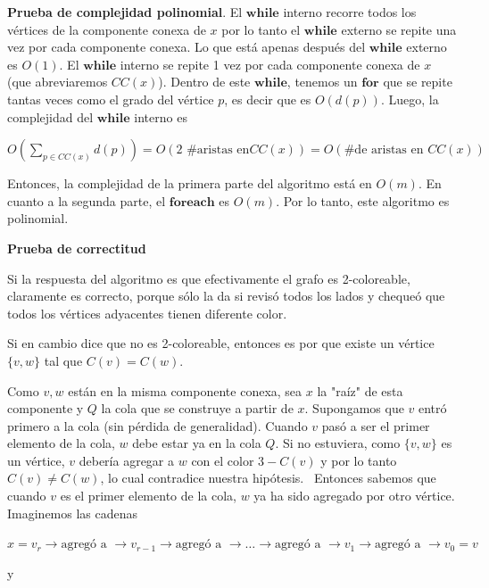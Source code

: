 \documentclass[10pt,a4paper]{article}
\begin{document}
\textbf{Prueba de complejidad polinomial}. El $\textbf{while}$ interno recorre todos los vértices de la componente conexa de $x$ por lo tanto el $\textbf{while}$ externo se repite una vez por cada componente conexa. Lo que está apenas después del $\textbf{while}$ externo es $O(1)$. El $\textbf{while}$ interno se repite 1 vez por cada componente conexa de $x$ (que abreviaremos $CC(x)$). Dentro de este $\textbf{while}$, tenemos un $\textbf{for}$ que se repite tantas veces como el grado del vértice $p$, es decir que es $O(d(p))$. Luego, la complejidad del $\textbf{while}$ interno es

\begin{center}
$O(\sum_{p \in CC(x)}d(p)) = O(2\text{ \# aristas en} CC(x)) = O(\text{\# de aristas en }CC(x))$
\end{center}

Entonces, la complejidad de la primera parte del algoritmo está en $O(m)$. En cuanto a la segunda parte, el $\textbf{foreach}$ es $O(m)$. Por lo tanto, este algoritmo es polinomial.

\textbf{Prueba de correctitud}

Si la respuesta del algoritmo es que efectivamente el grafo es 2-coloreable, claramente es correcto, porque sólo la da si revisó todos los lados y chequeó que todos los vértices adyacentes tienen diferente color.

Si en cambio dice que no es 2-coloreable, entonces es por que existe un vértice $\{v, w\}$ tal que $C(v) = C(w)$.

Como $v, w$ están en la misma componente conexa, sea $x$ la "raíz" de esta componente y $Q$ la cola que se construye a partir de $x$. Supongamos que $v$ entró primero a la cola (sin pérdida de generalidad). Cuando $v$ pasó a ser el primer elemento de la cola, $w$ debe estar ya en la cola $Q$. Si no estuviera, como $\{v, w\}$ es un vértice, $v$ debería agregar a $w$ con el color $3 - C(v)$ y por lo tanto $C(v) \neq C(w)$, lo cual contradice nuestra hipótesis.  Entonces sabemos que cuando $v$ es el primer elemento de la cola, $w$ ya ha sido agregado por otro vértice. Imaginemos las cadenas

\begin{center}
$x = v_r \rightarrow\text{agregó a } \rightarrow v_{r-1} \rightarrow\text{agregó a } \rightarrow \dots \rightarrow\text{agregó a } \rightarrow v_1 \rightarrow\text{agregó a } \rightarrow v_0 = v$
\end{center}

\begin{center}
y
\end{center}
\end{document}
